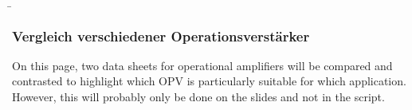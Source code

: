 \begin{frame}
	\b{\frametitle{Vergleich verschiedener Operationsverstärker}
    On this page, two data sheets for operational amplifiers will be compared and contrasted to highlight which OPV is particularly suitable for which application.
    However, this will probably only be done on the slides and not in the script.    
}
\end{frame}